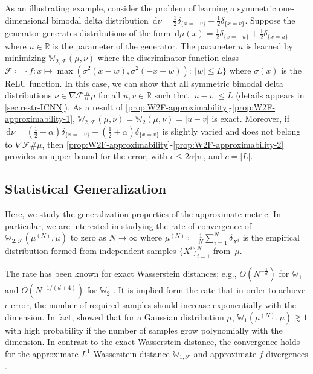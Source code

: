 \documentclass[10pt]{article}
\newcommand{\ud}{\,\mathrm{d}}
\newcommand{\real}{\mathbb{R}}
\newcommand{\W}{\mathds{W}}
\newcommand{\calF}{\mathcal{F}}
\numberwithin{equation}{section}
\begin{document}
As an illustrating example, consider the problem of learning a symmetric one-dimensional bimodal delta distribution $\ud \nu = \frac{1}{2}\delta_{\{x=-v\}} + \frac{1}{2}\delta_{\{x=v\}}$. Suppose the generator generates distributions of the form $\ud \mu(x) = \frac{1}{2}\delta_{\{x=-u\}} + \frac{1}{2}\delta_{\{x=u\}}$ where $u\in \real $ is the parameter of the generator. The parameter $u$ is learned by minimizing $\W_{2,\calF}(\mu,\nu)$ where the discriminator function class $\calF \coloneqq \{f:x\mapsto \max(\sigma^2(x-w),\sigma^2(-x-w)):~|w|\leq L\}$ where $\sigma(x)$ is the ReLU function. In this case, we can show that all symmetric bimodal delta distributions $\nu \in \nabla \calF \# \mu$ for all $u,v\in \real$ such that $|u-v|\leq L$ (details appears in \autoref{sec:restr-ICNN}). As a result of \autoref{prop:W2F-approximability}-\eqref{prop:W2F-approximability-1}, $\W_{2,\calF}(\mu,\nu)=\W_2(\mu,\nu)= |u-v|$ is exact. Moreover, if $\ud \nu = (\frac{1}{2}-\alpha)\delta_{\{x=-v\}} + (\frac{1}{2}+\alpha)\delta_{\{x=v\}}$ is slightly varied and does not belong to $\nabla \calF \# \mu$, then \autoref{prop:W2F-approximability}-\eqref{prop:W2F-approximability-2} provides an upper-bound for the error, with $\epsilon \leq 2\alpha|v|$, and $c=|L|$. 


\subsection{Statistical Generalization}\label{sec:muN-mu}
Here, we study the generalization properties of the approximate metric. In particular, we are interested in studying the rate of convergence of $\W_{2,\calF}(\mu^{(N)},\mu)$ to zero as $N \to \infty$ where $\mu^{(N)}\coloneqq \frac{1}{N}\sum_{i=1}^N\delta_{X^i}$ is the empirical distribution formed from independent samples $\{X^i\}_{i=1}^N$ from~$\mu$. 

The rate has been known for exact Wasserstein distances; e.g., $O(N^{-\frac{1}{d}})$ for $\W_1$ \citep{dudley1969speed} and $O(N^{-1/(d+4)})$ for $\W_2$ \cite[Section 10.2]{rachev1998mass}. It is implied form the rate that in order to achieve $\epsilon$ error, the number of required samples should increase exponentially with the dimension. In fact, \citet{arora2017generalization} showed that for a Gaussian distribution $\mu$, $\W_{1}(\mu^{(N)},\mu)\gtrsim 1$ with high probability if the number of samples grow polynomially with the dimension. In contrast to the exact Wasserstein distance, the convergence holds for the approximate $L^1$-Wasserstein distance $\W_{1,\calF}$ and approximate $f$-divergences \citep{arora2017generalization,zhang2017discrimination}.
 
\end{document}
